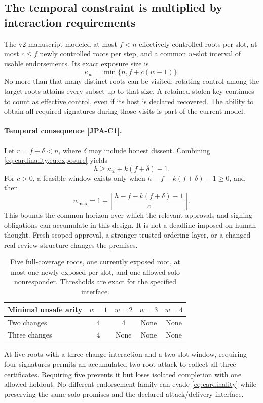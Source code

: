 \documentclass[11pt,a4paper]{article}
\theoremstyle{definition}\newtheorem{definition}{Definition}
\newcommand{\idtag}[1]{\textnormal{\textsf{[#1]}}}
\begin{document}
\subsection{The temporal constraint is multiplied by interaction requirements}
The v2 manuscript modeled at most $f<n$ effectively controlled roots per slot, at most $c\le f$ newly controlled roots per step, and a common $w$-slot interval of usable endorsements. Its exact exposure size is
\begin{equation}
\kappa_w=\min\{n,f+c(w-1)\}.
\label{eq:exposure}
\end{equation}
No more than that many distinct roots can be visited; rotating control among the target roots attains every subset up to that size. A retained stolen key continues to count as effective control, even if its host is declared recovered. The ability to obtain all required signatures during those visits is part of the current model.

\paragraph{Temporal consequence \idtag{JPA-C1}.}
Let $r=f+\delta<n$, where $\delta$ may include honest dissent. Combining \cref{eq:cardinality,eq:exposure} yields
\begin{equation}
\boxed{h\ge\kappa_w+k(f+\delta)+1.}
\label{eq:temporal}
\end{equation}
For $c>0$, a feasible window exists only when $h-f-k(f+\delta)-1\ge0$, and then
\begin{equation}
\boxed{w_{\max}=1+\left\lfloor\frac{h-f-k(f+\delta)-1}{c}\right\rfloor.}
\label{eq:window}
\end{equation}
This bounds the common horizon over which the relevant approvals and signing obligations can accumulate in this design. It is not a deadline imposed on human thought. Fresh scoped approval, a stronger trusted ordering layer, or a changed real review structure changes the premises.

\begin{table}[t]\centering\small
\caption{Five full-coverage roots, one currently exposed root, at most one newly exposed per slot, and one allowed solo nonresponder. Thresholds are exact for the specified interface.}
\label{tab:windows}
\begin{tabular}{@{}lcccc@{}}\toprule
Minimal unsafe arity & $w=1$ & $w=2$ & $w=3$ & $w=4$\\\midrule
Two changes &4&4&None&None\\
Three changes &4&None&None&None\\\bottomrule
\end{tabular}
\end{table}
At five roots with a three-change interaction and a two-slot window, requiring four signatures permits an accumulated two-root attack to collect all three certificates. Requiring five prevents it but loses isolated completion with one allowed holdout. No different endorsement family can evade \cref{eq:cardinality} while preserving the same solo promises and the declared attack/delivery interface.
\end{document}
